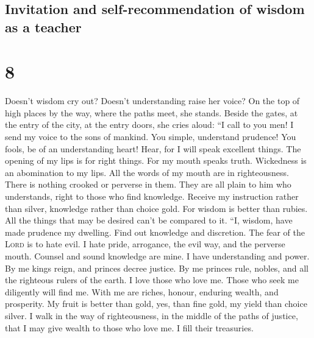\hypertarget{invitation-and-self-recommendation-of-wisdom-as-a-teacher}{%
\subsection{Invitation and self-recommendation of wisdom as a
teacher}\label{invitation-and-self-recommendation-of-wisdom-as-a-teacher}}

\hypertarget{section-7}{%
\section{8}\label{section-7}}

 Doesn't wisdom cry out? Doesn't understanding raise her
voice?  On the top of high places by the way, where the
paths meet, she stands.  Beside the gates, at the entry of
the city, at the entry doors, she cries aloud:  ``I call
to you men! I send my voice to the sons of mankind.  You
simple, understand prudence! You fools, be of an understanding heart!
 Hear, for I will speak excellent things. The opening of
my lips is for right things.  For my mouth speaks truth.
Wickedness is an abomination to my lips.  All the words of
my mouth are in righteousness. There is nothing crooked or perverse in
them.  They are all plain to him who understands, right to
those who find knowledge.  Receive my instruction rather
than silver, knowledge rather than choice gold.  For
wisdom is better than rubies. All the things that may be desired can't
be compared to it.  ``I, wisdom, have made prudence my
dwelling. Find out knowledge and discretion.  The fear of
the \textsc{Lord} is to hate evil. I hate pride, arrogance, the evil
way, and the perverse mouth.  Counsel and sound knowledge
are mine. I have understanding and power.  By me kings
reign, and princes decree justice.  By me princes rule,
nobles, and all the righteous rulers of the earth.  I
love those who love me. Those who seek me diligently will find me.
 With me are riches, honour, enduring wealth, and
prosperity.  My fruit is better than gold, yes, than fine
gold, my yield than choice silver.  I walk in the way of
righteousness, in the middle of the paths of justice, 
that I may give wealth to those who love me. I fill their treasuries.

